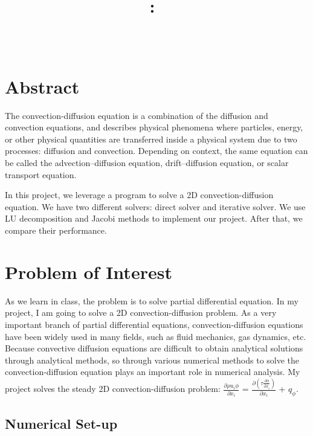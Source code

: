 \documentclass{article}
\title{\vspace{2in}\textmd{\textbf{\hmwkClass:\ \hmwkTitle}} \\
\vspace{0.1in}\large{ \hmwkClassTime}\vspace{3in}}
\author{\textbf{\hmwkAuthorName} \\ \vspace{0.1in}
\hmwkDueDate }
\date{} %
\begin{document}
\begin{spacing}{1.1}
\maketitle

\newpage
\section*{Abstract}

The convection-diffusion equation is a combination of the diffusion and convection equations, and describes physical phenomena where particles, energy, or other physical quantities are transferred inside a physical system due to two processes: diffusion and convection. Depending on context, the same equation can be called the advection–diffusion equation, drift–diffusion equation, or scalar transport equation.

In this project, we leverage a program to solve a 2D convection-diffusion equation. We have two different solvers: direct solver and iterative solver. We use LU decomposition and Jacobi methods to implement our project. After that, we compare their performance. 

\section{Problem of Interest}

\begin{itemize}
    As we learn in class, the problem is to solve partial differential equation.
    In my project, I am going to solve a 2D convection-diffusion problem. As a very important branch of partial differential equations, convection-diffusion equations have been widely used in many fields, such as fluid mechanics, gas dynamics, etc. Because convective diffusion equations are difficult to obtain analytical solutions through analytical methods, so through various numerical methods to solve the convection-diffusion equation plays an important role in numerical analysis. My project solves the steady 2D convection-diffusion problem: 
    $\frac{\partial \rho u_i \phi}{\partial x_i}$ = $\frac{\partial (\tau \frac{\partial \phi }{\partial x_i})}{\partial x_i}$ + $q_\phi$. 

\end{itemize}

\subsection{Numerical Set-up}


\end{spacing}
\end{document}
